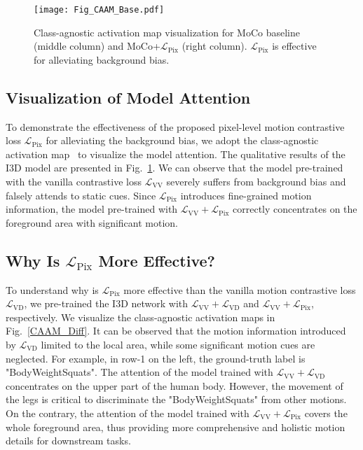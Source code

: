 \documentclass[sigconf,screen]{acmart}
\begin{document}
\begin{figure}[tbp]
\begin{center}
\texttt{[image: Fig\_CAAM\_Base.pdf]}
\end{center}
\caption{Class-agnostic activation map visualization for MoCo baseline (middle column) and MoCo+$\mathcal{L}_{\mathrm{Pix}}$ (right column). $\mathcal{L}_{\mathrm{Pix}}$ is effective for alleviating background bias.
}
\label{CAAM_Base}
\end{figure}

\subsection{Visualization of Model Attention} 
To demonstrate the effectiveness of the proposed pixel-level motion contrastive loss $\mathcal{L}_{\mathrm{Pix}}$ for alleviating the background bias, we adopt the class-agnostic activation map~\cite{CAAM} to visualize the model attention. The qualitative results of the I3D model are presented in Fig.~\ref{CAAM_Base}. We can observe that the model pre-trained with the vanilla contrastive loss $\mathcal{L}_{\mathrm{VV}}$ severely suffers from background bias and falsely attends to static cues. Since $\mathcal{L}_{\mathrm{Pix}}$ introduces fine-grained motion information, the model pre-trained with $\mathcal{L}_{\mathrm{VV}} + \mathcal{L}_{\mathrm{Pix}}$ correctly concentrates on the foreground area with significant motion.

\subsection{Why Is \texorpdfstring{$\mathcal{L}_{\mathrm{Pix}}$}{} More Effective?} 
To understand why is $\mathcal{L}_{\mathrm{Pix}}$ more effective than the vanilla motion contrastive loss $\mathcal{L}_{\mathrm{VD}}$, we pre-trained the I3D network with $\mathcal{L}_{\mathrm{VV}} + \mathcal{L}_{\mathrm{VD}}$ and $\mathcal{L}_{\mathrm{VV}} + \mathcal{L}_{\mathrm{Pix}}$, respectively. We visualize the class-agnostic activation maps in Fig.~\ref{CAAM_Diff}. It can be observed that the motion information introduced by $\mathcal{L}_{\mathrm{VD}}$ limited to the local area, while some significant motion cues are neglected. For example, in row-1 on the left, the ground-truth label is "BodyWeightSquats". The attention of the model trained with $\mathcal{L}_{\mathrm{VV}} + \mathcal{L}_{\mathrm{VD}}$ concentrates on the upper part of the human body. However, the movement of the legs is critical to discriminate the "BodyWeightSquats" from other motions. On the contrary, the attention of the model trained with $\mathcal{L}_{\mathrm{VV}} + \mathcal{L}_{\mathrm{Pix}}$ covers the whole foreground area, thus providing more comprehensive and holistic motion details for downstream tasks.
\end{document}
